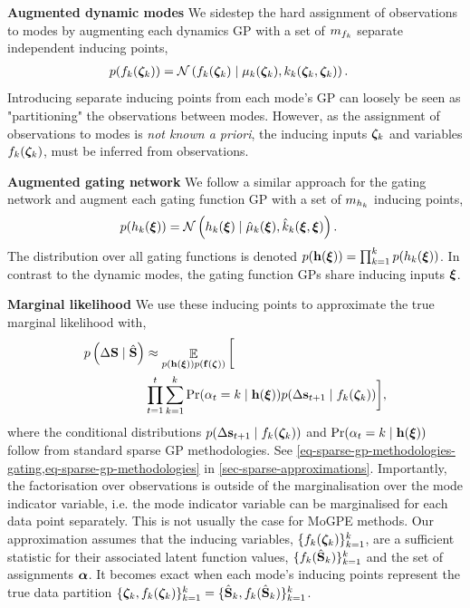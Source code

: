 \documentclass[twoside]{article}
\DeclareMathOperator{\E}{\mathbb{E}}
\newcommand{\numData}{\ensuremath{t}}
\newcommand{\modeInd}{\ensuremath{k}}
\newcommand{\NumData}{\ensuremath{\MakeUppercase{\numData}}}
\newcommand{\ModeInd}{\ensuremath{\MakeUppercase{\modeInd}}}
\newcommand{\mode}[1]{\ensuremath{#1_{\modeInd}}}
\newcommand{\gatingFunc}{\ensuremath{h}}
\newcommand{\latentFunc}{\ensuremath{f}}
\begin{document}
\textbf{Augmented dynamic modes}
We sidestep the hard assignment of observations to modes by augmenting each dynamics GP with a set
of \(\NumInducing_{\mode{\latentFunc}}\) separate independent inducing points,
\begin{align} \label{eq-experts-inducing-prior}
\expertInducingPrior
&=  \mathcal{N}\left( \expertInducingOutput \mid
\expertMeanFunc(\expertInducingInput),
\expertCovFunc(\expertInducingInput, \expertInducingInput) \right).
\end{align}
Introducing separate inducing points from each mode's GP can loosely be seen as "partitioning"
the observations between modes.
However, as the assignment of observations to modes is \emph{not known a priori}, the inducing inputs
\(\expertInducingInput\) and variables \(\expertInducingOutput\), must be inferred from observations.

\textbf{Augmented gating network}
We follow a similar approach for the gating network and augment each gating function GP with a
set of \(\NumInducing_{\mode{\gatingFunc}}\) inducing points,
\begin{align} \label{eq-gatings-inducing-prior}
\gatingInducingPrior
&= \mathcal{N}\left( \gatingInducingOutput \mid
\gatingMeanFunc(\gatingInducingInput),
\gatingCovFunc(\gatingInducingInput, \gatingInducingInput) \right).
\end{align}
The distribution over all gating functions is denoted \(\gatingsInducingPrior =\prod_{\modeInd=1}^\ModeInd \gatingInducingPrior\).
In contrast to the dynamic modes, the gating function GPs share inducing inputs \(\bm{\xi}\).

\textbf{Marginal likelihood}
We use these inducing points to approximate the true marginal likelihood with,
\begin{align} \label{eq-augmented-marginal-likelihood-main}
\evidence &\approx
\E_{\gatingsInducingPrior \expertsInducingPrior} \bigg[  \\
&\prod_{\numData=1}^{\NumData} \sum_{\modeInd=1}^{\ModeInd} \singleGatingGivenInducing  \singleExpertGivenInducing \bigg], \nonumber
\end{align}
where the conditional distributions \(\singleExpertGivenInducing\) and \(\singleGatingGivenInducing\)
follow from standard sparse GP methodologies.
See \cref{eq-sparse-gp-methodologies-gating,eq-sparse-gp-methodologies} in \cref{sec-sparse-approximations}.
Importantly, the factorisation over observations is outside of the marginalisation over the mode indicator variable, i.e.
the mode indicator variable can be marginalised for each data point separately.
This is not usually the case for MoGPE methods.
Our approximation assumes that the inducing variables,
\(\{\expertInducingOutput\}_{\modeInd=1}^\ModeInd\), are
a sufficient statistic for their associated latent function values,
\(\{\mode{\latentFunc}(\allInputK) \}_{\modeInd=1}^\ModeInd\)
and the set of assignments \(\bm{\alpha}\).
It becomes exact when each mode's inducing points represent the true data partition
\(\{\expertInducingInput, \expertInducingOutput\}_{\modeInd=1}^{\ModeInd} = \{\allInputK, \mode{\latentFunc}(\allInputK)\}_{\modeInd=1}^{\ModeInd}\).
\end{document}
